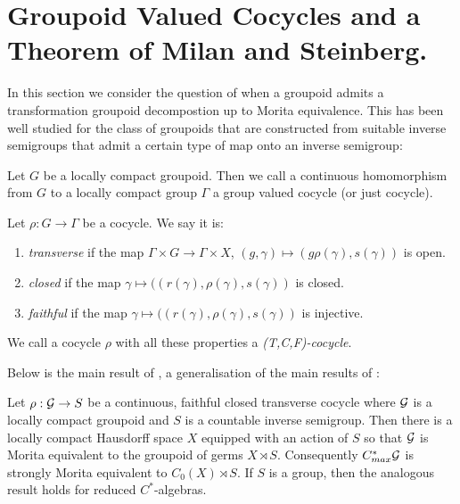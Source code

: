 \section{Groupoid Valued Cocycles and a Theorem of Milan and Steinberg.}

In this section we consider the question of when a groupoid admits a transformation groupoid decompostion up to Morita equivalence. This has been well studied for the class of groupoids that are constructed from suitable inverse semigroups \cite{MR1900993,Milan-Steinberg} that admit a certain type of map onto an inverse semigroup:

\begin{definition}
Let $G$ be a locally compact groupoid. Then we call a continuous homomorphism from $G$ to a locally compact group $\Gamma$ a group valued cocycle (or just cocycle).
\end{definition}

\begin{definition}
Let $\rho: G \rightarrow \Gamma$ be a cocycle. We say it is:
\begin{enumerate}
\item \textit{transverse} if the map $\Gamma \times G \rightarrow \Gamma \times X$, $(g, \gamma) \mapsto (g\rho(\gamma),s(\gamma))$ is open.
\item \textit{closed} if the map $\gamma \mapsto ((r(\gamma),\rho(\gamma),s(\gamma))$ is closed.
\item \textit{faithful} if the map $\gamma \mapsto ((r(\gamma),\rho(\gamma),s(\gamma))$ is injective.
\end{enumerate}
We call a cocycle $\rho$ with all these properties a \textit{(T,C,F)-cocycle}.
\end{definition}

Below is the main result of \cite{Milan-Steinberg}, a generalisation of the main results of \cite{MR1900993}:

\begin{theorem}\label{Thm:IT2}
Let $\rho: \mathcal{G} \rightarrow S$ be a continuous, faithful closed transverse cocycle where $\mathcal{G}$ is a locally compact groupoid and $S$ is a countable inverse semigroup. Then there is a locally compact Hausdorff space $X$ equipped with an action of $S$ so that $\mathcal{G}$ is Morita equivalent to the groupoid of germs $X \rtimes S$. Consequently $C^{*}_{max}\mathcal{G}$ is strongly Morita equivalent to $C_{0}(X)\rtimes S$. If $S$ is a group, then the analogous result holds for reduced $C^{*}$-algebras.
\end{theorem}

